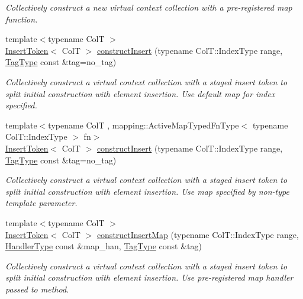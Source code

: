 \begin{DoxyCompactItemize}
\begin{DoxyCompactList}\small\item\em Collectively construct a new virtual context collection with a pre-\/registered map function. \end{DoxyCompactList}\item 
{\footnotesize template$<$typename ColT $>$ }\\\hyperlink{structvt_1_1vrt_1_1collection_1_1_insert_token}{Insert\+Token}$<$ ColT $>$ \hyperlink{structvt_1_1vrt_1_1collection_1_1_collection_manager_a0e15cc861c0d979d8977b226efd7c271}{construct\+Insert} (typename Col\+T\+::\+Index\+Type range, \hyperlink{namespacevt_a84ab281dae04a52a4b243d6bf62d0e52}{Tag\+Type} const \&tag=no\+\_\+tag)
\begin{DoxyCompactList}\small\item\em Collectively construct a virtual context collection with a staged insert token to split initial construction with element insertion. Use default map for index specified. \end{DoxyCompactList}\item 
{\footnotesize template$<$typename ColT , mapping\+::\+Active\+Map\+Typed\+Fn\+Type$<$ typename Col\+T\+::\+Index\+Type $>$ fn$>$ }\\\hyperlink{structvt_1_1vrt_1_1collection_1_1_insert_token}{Insert\+Token}$<$ ColT $>$ \hyperlink{structvt_1_1vrt_1_1collection_1_1_collection_manager_a51e938c8c05bf9a39ab69532ea12336d}{construct\+Insert} (typename Col\+T\+::\+Index\+Type range, \hyperlink{namespacevt_a84ab281dae04a52a4b243d6bf62d0e52}{Tag\+Type} const \&tag=no\+\_\+tag)
\begin{DoxyCompactList}\small\item\em Collectively construct a virtual context collection with a staged insert token to split initial construction with element insertion. Use map specified by non-\/type template parameter. \end{DoxyCompactList}\item 
{\footnotesize template$<$typename ColT $>$ }\\\hyperlink{structvt_1_1vrt_1_1collection_1_1_insert_token}{Insert\+Token}$<$ ColT $>$ \hyperlink{structvt_1_1vrt_1_1collection_1_1_collection_manager_a5fdc620b8c03bf7748802e35cff1afe9}{construct\+Insert\+Map} (typename Col\+T\+::\+Index\+Type range, \hyperlink{namespacevt_af64846b57dfcaf104da3ef6967917573}{Handler\+Type} const \&map\+\_\+han, \hyperlink{namespacevt_a84ab281dae04a52a4b243d6bf62d0e52}{Tag\+Type} const \&tag)
\begin{DoxyCompactList}\small\item\em Collectively construct a virtual context collection with a staged insert token to split initial construction with element insertion. Use pre-\/registered map handler passed to method. \end{DoxyCompactList}\item 

\end{DoxyCompactItemize}
